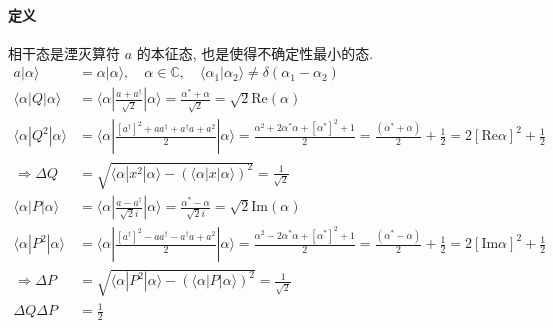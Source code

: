\documentclass[../../main.tex]{subfiles}
\begin{document}
\paragraph{定义}
相干态是湮灭算符 $a$ 的本征态, 也是使得不确定性最小的态. 
\begin{align*}
    a|\alpha\rangle &= \alpha|\alpha\rangle,\quad \alpha\in\mathbb{C},\quad \langle\alpha_{1}|\alpha_{2}\rangle \neq \delta(\alpha_{1}-\alpha_{2})\\
    \langle\alpha|Q|\alpha\rangle &= \langle\alpha|\frac{a + a^{\dagger}}{\sqrt{2}}|\alpha\rangle = \frac{\alpha^{*} + \alpha}{\sqrt{2}} = \sqrt{2}\text{Re}(\alpha)\\
    \langle\alpha|Q^{2}|\alpha\rangle &= \langle\alpha|\frac{[a^{\dagger}]^{2} + aa^{\dagger} + a^{\dagger}a + a^{2}}{2}|\alpha\rangle = \frac{\alpha^{2} + 2\alpha^{*}\alpha + [\alpha^{*}]^{2} + 1}{2} = \frac{(\alpha^{*} + \alpha)}{2} + \frac{1}{2} = 2[\text{Re}\alpha]^{2} + \frac{1}{2}\\
    \Rightarrow\Delta Q &= \sqrt{\langle\alpha|x^{2}|\alpha\rangle - (\langle\alpha|x|\alpha\rangle)^{2}} = \frac{1}{\sqrt{2}}\\
    \langle\alpha|P|\alpha\rangle &= \langle\alpha|\frac{a - a^{\dagger}}{\sqrt{2}i}|\alpha\rangle = \frac{\alpha^{*} - \alpha}{\sqrt{2}i} = \sqrt{2}\text{Im}(\alpha)\\
    \langle\alpha|P^{2}|\alpha\rangle &= \langle\alpha|\frac{[a^{\dagger}]^{2} - aa^{\dagger} - a^{\dagger}a + a^{2}}{2}|\alpha\rangle = \frac{\alpha^{2} - 2\alpha^{*}\alpha + [\alpha^{*}]^{2} + 1}{2} = \frac{(\alpha^{*} - \alpha)}{2} + \frac{1}{2} = 2[\text{Im}\alpha]^{2} + \frac{1}{2}\\
    \Rightarrow\Delta P &= \sqrt{\langle\alpha|P^{2}|\alpha\rangle - (\langle\alpha|P|\alpha\rangle)^{2}} = \frac{1}{\sqrt{2}}\\
    \Delta Q\Delta P &= \frac{1}{2}
\end{align*}
\end{document}

